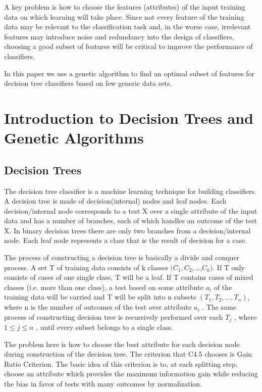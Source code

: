 \documentclass[conference]{IEEEtran}
\begin{document}
 A key problem is how to choose the features (attributes) of the input training data on which
learning will take place. Since not every feature of the training  data may be relevant to the classification task and, in the worse case, irrelevant features may introduce noise and redundancy into the design of classifiers, choosing a good subset of features will be critical to improve the performance of classifiers. 



In this paper we use a genetic algorithm to find an optimal subset of features for decision tree classifiers based on few generic data sets.


\section{Introduction to Decision Trees and Genetic Algorithms}
\subsection{Decision Trees}
The decision tree classifier is a machine learning technique for building classifiers. A decision tree is made of
decision(internal) nodes and leaf nodes. Each decision/internal node corresponds to
a test X over a single attribute of the input data and has a number
of branches, each of which handles an outcome of the test X. In binary decision trees there are only two branches from a decision/internal node.
Each leaf node represents a class that is the result of decision for
a case.



The process of constructing a decision tree is basically a divide and conquer process. A set T of training data consists of k
classes $( C_1, C_2,$…,$ C_k )$. If T only consists of cases of one single
class, T will be a leaf. If T contains
cases of mixed classes (i.e. more than one class), a test based on
some attribute $a_i$ of the training data will be carried and T will
be split into n subsets $( T_1 , T_2 , …, T_n)$, where n is the number of
outcomes of the test over attribute $a_i$ . The same process of
constructing decision tree is recursively performed over each $T_j$ ,
where $1\leq j \leq n$ , until every subset belongs to a single class.



The problem here is how to choose the best attribute for each
decision node during construction of the decision tree. The
criterion that C4.5 chooses is Gain Ratio Criterion. The basic idea
of this criterion is to, at each splitting step, choose an attribute
which provides the maximum information gain while reducing
the bias in favor of tests with many outcomes by normalization.
\end{document}
